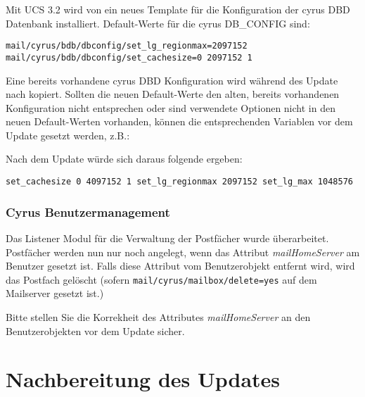 Mit UCS 3.2 wird von
 ein neues \ucsUCR{} Template
 für die Konfiguration der cyrus DBD
Datenbank installiert. Default-Werte für die cyrus DB\_CONFIG sind:

\texttt{mail/cyrus/bdb/dbconfig/set\_lg\_regionmax=2097152}\newline
\texttt{mail/cyrus/bdb/dbconfig/set\_cachesize=0 2097152 1}

Eine bereits vorhandene cyrus DBD Konfiguration wird während des Update nach
 kopiert. Sollten die neuen
Default-Werte den alten, bereits vorhandenen Konfiguration nicht entsprechen
oder sind verwendete Optionen nicht in den neuen Default-Werten vorhanden,
können die entsprechenden \ucsUCR{} Variablen vor dem Update gesetzt
werden, z.B.:

\newline
{}\newline
{}

Nach dem Update würde sich daraus folgende  ergeben:

\texttt{set\_cachesize 0 4097152 1\newline
set\_lg\_regionmax 2097152\newline
set\_lg\_max 1048576\newline
} 

\subsection{Cyrus Benutzermanagement}

Das Listener Modul für die Verwaltung der Postfächer wurde überarbeitet.
Postfächer werden nun nur noch angelegt, wenn das Attribut \emph{mailHomeServer} am
Benutzer gesetzt ist. Falls diese Attribut vom Benutzerobjekt entfernt wird,
wird das Postfach gelöscht (sofern
\texttt{mail/cyrus/mailbox/delete=yes} auf dem
Mailserver gesetzt ist.)

Bitte stellen Sie die Korrekheit des Attributes \emph{mailHomeServer} an den
Benutzerobjekten vor dem Update sicher.

\chapter{Nachbereitung des Updates}

